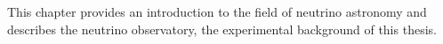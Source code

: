 This chapter provides
  an introduction to the field of neutrino astronomy
  and describes the \icecube{} neutrino observatory,
    the experimental background of this thesis.
